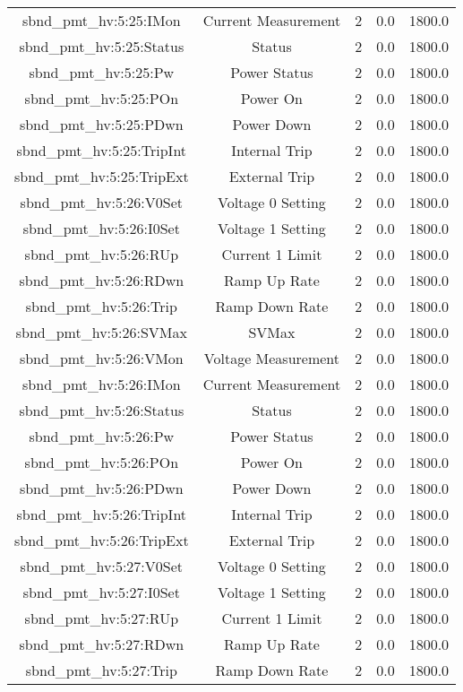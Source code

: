 \begin{table}[ptb]
\begin{tabular}{c | c c c c}
sbnd_pmt_hv:5:25:IMon & Current Measurement & 2 & 0.0 & 1800.0\\ 
sbnd_pmt_hv:5:25:Status & Status & 2 & 0.0 & 1800.0\\ 
sbnd_pmt_hv:5:25:Pw & Power Status & 2 & 0.0 & 1800.0\\ 
sbnd_pmt_hv:5:25:POn & Power On & 2 & 0.0 & 1800.0\\ 
sbnd_pmt_hv:5:25:PDwn & Power Down & 2 & 0.0 & 1800.0\\ 
sbnd_pmt_hv:5:25:TripInt & Internal Trip & 2 & 0.0 & 1800.0\\ 
sbnd_pmt_hv:5:25:TripExt & External Trip & 2 & 0.0 & 1800.0\\ 
sbnd_pmt_hv:5:26:V0Set & Voltage 0 Setting & 2 & 0.0 & 1800.0\\ 
sbnd_pmt_hv:5:26:I0Set & Voltage 1 Setting & 2 & 0.0 & 1800.0\\ 
sbnd_pmt_hv:5:26:RUp & Current 1 Limit & 2 & 0.0 & 1800.0\\ 
sbnd_pmt_hv:5:26:RDwn & Ramp Up Rate & 2 & 0.0 & 1800.0\\ 
sbnd_pmt_hv:5:26:Trip & Ramp Down Rate & 2 & 0.0 & 1800.0\\ 
sbnd_pmt_hv:5:26:SVMax & SVMax & 2 & 0.0 & 1800.0\\ 
sbnd_pmt_hv:5:26:VMon & Voltage Measurement & 2 & 0.0 & 1800.0\\ 
sbnd_pmt_hv:5:26:IMon & Current Measurement & 2 & 0.0 & 1800.0\\ 
sbnd_pmt_hv:5:26:Status & Status & 2 & 0.0 & 1800.0\\ 
sbnd_pmt_hv:5:26:Pw & Power Status & 2 & 0.0 & 1800.0\\ 
sbnd_pmt_hv:5:26:POn & Power On & 2 & 0.0 & 1800.0\\ 
sbnd_pmt_hv:5:26:PDwn & Power Down & 2 & 0.0 & 1800.0\\ 
sbnd_pmt_hv:5:26:TripInt & Internal Trip & 2 & 0.0 & 1800.0\\ 
sbnd_pmt_hv:5:26:TripExt & External Trip & 2 & 0.0 & 1800.0\\ 
sbnd_pmt_hv:5:27:V0Set & Voltage 0 Setting & 2 & 0.0 & 1800.0\\ 
sbnd_pmt_hv:5:27:I0Set & Voltage 1 Setting & 2 & 0.0 & 1800.0\\ 
sbnd_pmt_hv:5:27:RUp & Current 1 Limit & 2 & 0.0 & 1800.0\\ 
sbnd_pmt_hv:5:27:RDwn & Ramp Up Rate & 2 & 0.0 & 1800.0\\ 
sbnd_pmt_hv:5:27:Trip & Ramp Down Rate & 2 & 0.0 & 1800.0\\ 

\end{tabular}
\end{table}
